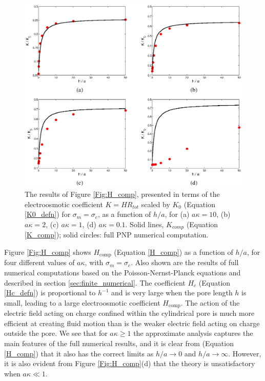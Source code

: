 \begin{figure}[H]
\begin{center}
\includegraphics[width=\textwidth]{finite_thickness/finite_pore_pic7.eps}
\caption{The results of Figure \ref{Fig:H_comp}, presented in terms of the electroosmotic coefficient $K=HR_{tot}$ scaled by $K_0$ (Equation \ref{K0_defn}) for $\sigma_m=\sigma_c$, as a function of $h/a$, for (a) $a\kappa=10$, (b) $a\kappa=2$, (c) $a\kappa=1$, (d) $a\kappa=0.1$. Solid lines, $K_{comp}$ (Equation \ref{K_comp}); solid circles: full PNP numerical computation.}
\label{Fig:K_comp}
\end{center}
\end{figure}

Figure \ref{Fig:H_comp} shows $H_\text{comp}$ (Equation \ref{H_comp}) as a function of $h/a$, for four
different values of $a\kappa$, with $\sigma_m=\sigma_c$. Also shown are the results of full numerical
computations based on the
Poisson-Nernst-Planck equations \cite{mao2014}
and described in section \ref{sec:finite_numerical}. 
The coefficient $H_c$ (Equation \ref{Hc_defn})
is proportional to $h^{-1}$ and is very large when the
pore length $h$ is small, leading to a large electroosmotic coefficient
$H_\text{comp}$. The action of the electric field
acting on charge confined within the cylindrical pore
is much more efficient at creating fluid motion than is the
weaker electric field acting on charge outside the pore.
We see that for $a\kappa\ge 1$ the
approximate analysis captures the main features of the full numerical
results, and it is clear from (Equation \ref{H_comp}) that it also has the
correct limits as $h/a\rightarrow 0$ and
$h/a\rightarrow\infty$. However,
it is also evident from Figure \ref{Fig:H_comp}(d)
that the theory is unsatisfactory when
$a\kappa\ll 1$.

